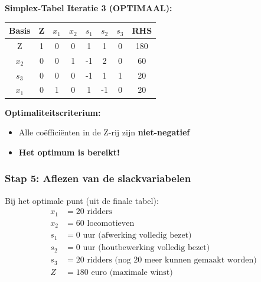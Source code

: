 \documentclass[a4paper,11pt]{article}
\begin{document}
\begin{oefenblok}
    \vspace{0.3cm}

    \textbf{Simplex-Tabel Iteratie 3 (OPTIMAAL):}

    \vspace{0.3cm}

    \begin{center}
        \begin{tabular}{|c|c|c|c|c|c|c|c|}
            \hline
            \textbf{Basis} & \textbf{Z} & \textbf{$x_1$} & \textbf{$x_2$} & \textbf{$s_1$} & \textbf{$s_2$} & \textbf{$s_3$} & \textbf{RHS} \\
            \hline
            Z              & 1          & 0              & 0              & 1              & 1              & 0              & 180          \\
            \hline
            $x_2$          & 0          & 0              & 1              & -1             & 2              & 0              & 60           \\
            \hline
            $s_3$          & 0          & 0              & 0              & -1             & 1              & 1              & 20           \\
            \hline
            $x_1$          & 0          & 1              & 0              & 1              & -1             & 0              & 20           \\
            \hline
        \end{tabular}
    \end{center}
    \FloatBarrier

    \textbf{Optimaliteitscriterium:}
    \begin{itemize}
        \item Alle coëfficiënten in de Z-rij zijn \textbf{niet-negatief}
        \item \textbf{Het optimum is bereikt!}
    \end{itemize}

    \subsubsection*{Stap 5: Aflezen van de slackvariabelen}

    Bij het optimale punt (uit de finale tabel):
    \begin{align*}
        x_1 & = 20 \text{ ridders}                                     \\
        x_2 & = 60 \text{ locomotieven}                                \\
        s_1 & = 0 \text{ uur (afwerking volledig bezet)}               \\
        s_2 & = 0 \text{ uur (houtbewerking volledig bezet)}           \\
        s_3 & = 20 \text{ ridders (nog 20 meer kunnen gemaakt worden)} \\
        Z   & = 180 \text{ euro (maximale winst)}
    \end{align*}


\end{oefenblok}
\end{document}
